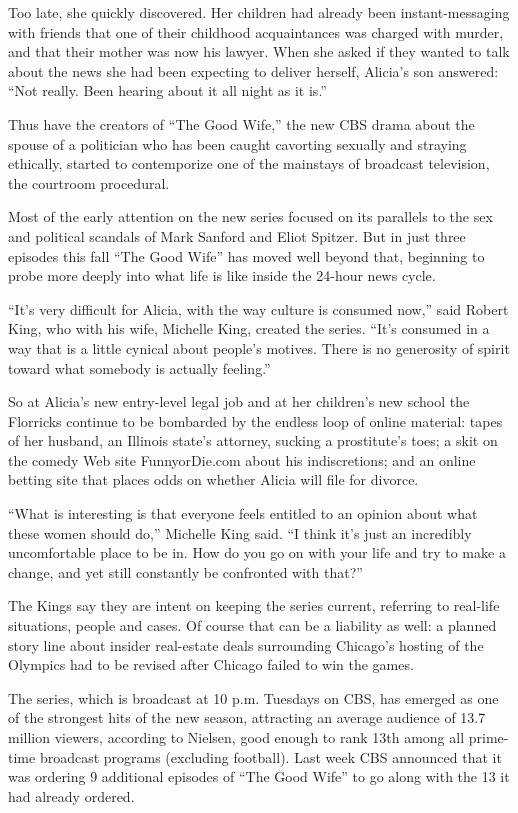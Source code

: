 ﻿\documentclass[12pt]{article}
\begin{document}
Too late, she quickly discovered. Her children had already been instant-messaging with friends that
one of their childhood acquaintances was charged with murder, and that their mother was now his
lawyer. When she asked if they wanted to talk about the news she had been expecting to deliver
herself, Alicia's son answered: ``Not really. Been hearing about it all night as it is.''

Thus have the creators of ``The Good Wife,'' the new CBS drama about the spouse of a politician who
has been caught cavorting sexually and straying ethically, started to contemporize one of the
mainstays of broadcast television, the courtroom procedural.

Most of the early attention on the new series focused on its parallels to the sex and political
scandals of Mark Sanford and Eliot Spitzer. But in just three episodes this fall ``The Good Wife''
has moved well beyond that, beginning to probe more deeply into what life is like inside the 24-hour
news cycle.

``It's very difficult for Alicia, with the way culture is consumed now,'' said Robert King, who with
his wife, Michelle King, created the series. ``It's consumed in a way that is a little
cynical\cite{cynical} about people's motives. There is no generosity of spirit toward what somebody
is actually feeling.''

So at Alicia's new entry-level legal job and at her children's new school the Florricks continue to
be bombarded\cite{bombard} by the endless loop of online material: tapes of her husband, an Illinois
state's attorney, sucking a prostitute's toes; a skit on the comedy Web site FunnyorDie.com about
his indiscretions; and an online betting site that places odds on whether Alicia will file for
divorce.

``What is interesting is that everyone feels entitled to an opinion about what these women should
do,'' Michelle King said. ``I think it's just an incredibly uncomfortable place to be in. How do you
go on with your life and try to make a change, and yet still constantly be confronted with that?''

The Kings say they are intent on keeping the series current, referring to real-life situations,
people and cases. Of course that can be a liability as well: a planned story line about insider
real-estate deals surrounding Chicago's hosting of the Olympics had to be revised after Chicago
failed to win the games.

The series, which is broadcast at 10 p.m. Tuesdays on CBS, has emerged as one of the strongest hits
of the new season, attracting an average audience of 13.7 million viewers, according to Nielsen,
good enough to rank 13th among all prime-time broadcast programs (excluding football). Last week CBS
announced that it was ordering 9 additional episodes of ``The Good Wife'' to go along with the 13 it
had already ordered.
\end{document}
